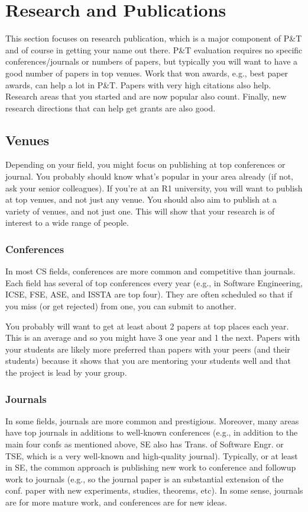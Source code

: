 \documentclass[oneside,11pt,dvipsnames]{book}
\begin{document}
\chapter{Research and Publications}\label{chap:research}

This section focuses on research publication, which is a major component of P\&T and of course in getting your name out there. P\&T evaluation requires no specific conferences/journals or numbers of papers, but typically you will want to have a good number of papers in top venues.
Work that won awards, e.g., best paper awards, can help a lot in P\&T. Papers with very high citations also help.  Research areas that you started and are now popular also count.  Finally, new research directions that can help get grants are also good.

\section{Venues}

Depending on your field, you might focus on publishing at top conferences or journal.  You probably should know what's popular in your area already (if not, ask your senior colleagues). If you're at an R1 university, you will want to publish at top venues, and not just any venue.  You should also aim to publish at a variety of venues, and not just one.  This will show that your research is of interest to a wide range of people.

\subsection{Conferences}
In most CS fields, conferences are more common and competitive than journals. Each field has several of top conferences every year (e.g., in Software Engineering, ICSE, FSE, ASE, and ISSTA are top four).  They are often scheduled so that if you miss (or get rejected) from one, you can submit to another.

You probably will want to get at least about 2 papers at top places each year. This is an average and so you might have 3 one year and 1 the next. Papers with your students are likely more preferred than papers with your peers (and their students) because it shows that you are mentoring your students well and that the project is lead by your group.




\subsection{Journals}
In some fields, journals are more common and prestigious. Moreover, many areas have top journals in additions to well-known conferences (e.g., in addition to the main four confs as mentioned above, SE also has Trans. of Software Engr. or TSE, which is a very well-known and high-quality journal).  Typically, or at least in SE, the common approach is publishing new work to conference and followup work to journals (e.g., so the journal paper is an substantial extension of the conf. paper with new experiments, studies, theorems, etc). In some sense, journals are for more mature work, and conferences are for new ideas.
\end{document}
